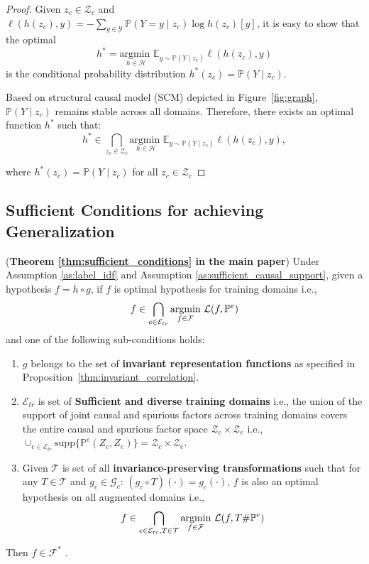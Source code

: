 \begin{proof}
Given $z_c\in \mathcal{Z}_c$ and $\ell(h(z_c), y) = -\sum_{y \in \mathcal{Y}} \mathbb{P}(Y = y \mid z_c) \log h(z_c)[y]$, it is easy to show that the optimal $$h^*=\underset{h\in \mathcal{H}}{\text{argmin }} \mathbb{E}_{y\sim\mathbb{P}(Y\mid z_c)} \ell\left ( h( z_c), y \right )$$ is the conditional probability distribution $h^*(z_c)=\mathbb{P}(Y\mid z_c)$.

Based on structural causal model (SCM) depicted in Figure~\ref{fig:graph}, $\mathbb{P}(Y\mid z_c)$  remains stable across all domains. Therefore, there exists an optimal function \(h^*\) such that:
\begin{equation*}
  h^* \in\bigcap_{z_c\in\mathcal{Z}_c} \underset{h\in \mathcal{H}}{\text{argmin }} \mathbb{E}_{y\sim\mathbb{P}(Y\mid z_c)} \ell\left ( h( z_c), y \right ),  
\end{equation*}

where $h^*(z_c)=\mathbb{P}(Y\mid z_c)$ for all $z_c\in \mathcal{Z}_c$
\end{proof}


\subsection{Sufficient Conditions for achieving Generalization}

\begin{theorem} (\textbf{Theorem \ref{thm:sufficient_conditions} in the main paper}) Under Assumption \ref{as:label_idf} and Assumption \ref{as:sufficient_causal_support}, given a hypothesis $f=h\circ g$, if $f$ is optimal hypothesis for training domains i.e.,
\begin{equation*}
    f\in \bigcap_{{e}\in \mathcal{E}_{tr}}\underset{f\in \mathcal{F}}{\text{argmin}} \ \loss{f,\mathbb{P}^{e}}
\end{equation*}
and one of the following sub-conditions holds:
\begin{enumerate}
    \item $g$ belongs to the set of \textbf{invariant representation functions} as specified in Proposition~\ref{thm:invariant_correlation}.
    
    \item $\mathcal{E}_{tr}$ is set of \textbf{Sufficient and diverse training domains} i.e., the union of the support of joint causal and spurious factors across training domains covers the entire causal and spurious factor space $\mathcal{Z}_c\times\mathcal{Z}_e$ i.e., $\cup_{e\in \mathcal{E}_{tr}}\text{supp}\{\mathbb{P}^{e} \left (Z_c, Z_e \right )\}=\mathcal{Z}_c\times\mathcal{Z}_e$.
    
    \item Given $\mathcal{T}$ is set of all \textbf{invariance-preserving transformations} such that for any $T\in \mathcal{T}$ and $g_c\in \mathcal{G}_c$: $(g_c\circ T)(\cdot)=g_c(\cdot)$, $f$ is also an optimal hypothesis on all augmented domains i.e., $$f\in \bigcap_{{e}\in \mathcal{E}_{tr}, T\in \mathcal{T}}\underset{f\in \mathcal{F}}{\text{argmin}} \ \loss{f,T\#\mathbb{P}^{e}}$$
\end{enumerate}
Then $f\in \mathcal{F}^*$
\label{thm:sufficient_conditions_apd}.
\end{theorem}

